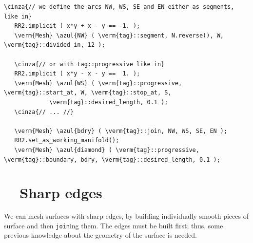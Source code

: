 \begin{Verbatim}[commandchars=\\\{\},formatcom=\small\tt,frame=single,
   label=parag-\ref{\numb section 3.\numb parag 17}.cpp,rulecolor=\color{coment},
   baselinestretch=0.94,framesep=2mm                                            ]
   \cinza{// we define the arcs NW, WS, SE and EN either as segments, like in}
   RR2.implicit ( x*y + x - y == -1. );
   \verm{Mesh} \azul{NW} ( \verm{tag}::segment, N.reverse(), W, \verm{tag}::divided_in, 12 );
   
   \cinza{// or with tag::progressive like in}
   RR2.implicit ( x*y - x - y ==  1. );
   \verm{Mesh} \azul{WS} ( \verm{tag}::progressive, \verm{tag}::start_at, W, \verm{tag}::stop_at, S,
             \verm{tag}::desired_length, 0.1 );
   \cinza{// ... //}
             
   \verm{Mesh} \azul{bdry} ( \verm{tag}::join, NW, WS, SE, EN );
   RR2.set_as_working_manifold();
   \verm{Mesh} \azul{diamond} ( \verm{tag}::progressive, \verm{tag}::boundary, bdry, \verm{tag}::desired_length, 0.1 );
\end{Verbatim}





\section{~~Sharp edges}\label{\numb section 3.\numb parag 18}

We can mesh surfaces with sharp edges, by building individually smooth pieces of surface
and then {\small\tt join}ing them.
The edges must be built first;
thus, some previous knowledge about the geometry of the surface is needed.

